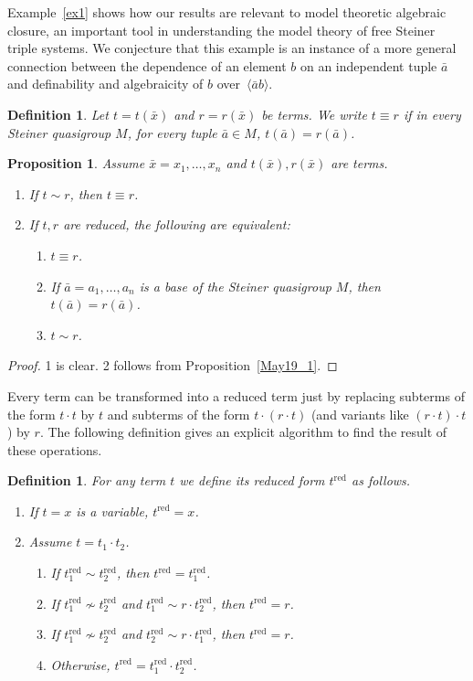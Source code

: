 \documentclass[a4paper, 11pt]{article}
\theoremstyle{note}
\newtheorem{df}[thm]{Definition}
\newtheorem{prop}[thm]{Proposition}
\begin{document}
Example~\ref{ex1} shows how our results are relevant to model theoretic algebraic closure, an important tool in understanding the model theory of free Steiner triple systems. We conjecture that this example is an instance of a more general connection between the dependence of an element $b$ on an independent tuple $\bar{a}$ and definability and algebraicity of $b$ over~$\langle \bar{a}b \rangle$.

\begin{df}
	Let $t=t(\bar{x})$ and $r=r(\bar{x})$ be terms. We write $t\equiv r$ if in every Steiner quasigroup  $M$, for every tuple $\bar{a}\in M$,  $t(\bar{a})= r(\bar{a})$.
\end{df}

\begin{prop}
	Assume $\bar{x}=x_1,\ldots,x_n$  and  $t(\bar{x}), r(\bar{x})$ are terms.
	\begin{enumerate}
		\item If $t\sim r$, then $t\equiv r$.
		\item If $t,r$ are reduced, the following are equivalent:
		\begin{enumerate}
			\item $t\equiv r$.
			\item If $\bar{a}=a_1,\ldots,a_n$ is a base of the Steiner quasigroup $M$, then  $t(\bar{a})=r(\bar{a})$.
			\item $t\sim r$.
		\end{enumerate}
	\end{enumerate}
\end{prop}
\begin{proof}
	1 is clear.  2 follows from  Proposition~\ref{May19_1}.
\end{proof}

Every term can be transformed into a reduced term just by replacing subterms of the form $t\cdot t$ by $t$  and subterms of the form $t\cdot(r\cdot t)$ (and variants like $(r\cdot t)\cdot t$) by $r$. The following definition gives an explicit algorithm to find the result of these operations.

\begin{df}
	For any term $t$ we define its reduced form  $t^\mathrm{red}$ as follows.
	\begin{enumerate}
		\item If $t=x$ is a variable,  $t^\mathrm{red}= x$.
		\item Assume $t=t_1\cdot t_2$.\begin{enumerate}
		\item If $t_1^\mathrm{red}\sim t_2^\mathrm{red}$, then  $t^\mathrm{red}=t_1^\mathrm{red}$.
		\item If  $t_1^\mathrm{red}\not\sim t_2^\mathrm{red}$  and  $t_1^\mathrm{red}\sim r\cdot t_2^\mathrm{red}$, then $t^\mathrm{red} =r$.
		\item If $t_1^\mathrm{red}\not\sim t_2^\mathrm{red}$  and  $t_2^\mathrm{red}\sim r\cdot t_1^\mathrm{red}$, then $t^\mathrm{red} =r$.
		\item Otherwise,  $t^\mathrm{red}= t_1^\mathrm{red}\cdot t_2^\mathrm{red}$.
		\end{enumerate}
		\end{enumerate}
\end{df}
\end{document}
